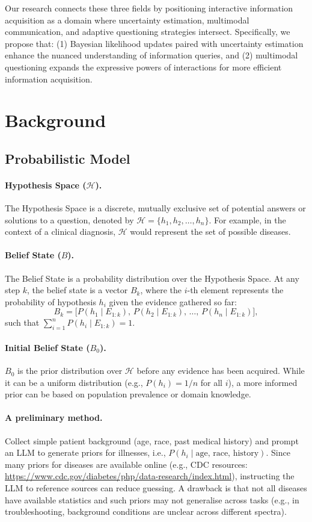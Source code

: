 \documentclass{article} %
\begin{document}
Our research connects these three fields by positioning interactive information acquisition as a domain where uncertainty estimation, multimodal communication, and adaptive questioning strategies intersect. Specifically, we propose that: (1) Bayesian likelihood updates paired with uncertainty estimation enhance the nuanced understanding of information queries, and (2) multimodal questioning expands the expressive powers of interactions for more efficient information acquisition.

\section{Background}

\subsection{Probabilistic Model}
\paragraph{Hypothesis Space ($\mathcal{H}$).}
The Hypothesis Space is a discrete, mutually exclusive set of potential answers or solutions to a question, denoted by $\mathcal{H}=\{h_1,h_2,\ldots,h_n\}$. For example, in the context of a clinical diagnosis, $\mathcal{H}$ would represent the set of possible diseases.

\paragraph{Belief State ($B$).}
The Belief State is a probability distribution over the Hypothesis Space. At any step $k$, the belief state is a vector $B_k$, where the $i$-th element represents the probability of hypothesis $h_i$ given the evidence gathered so far:
\[
B_k=\big[P(h_1\mid E_{1:k}),\,P(h_2\mid E_{1:k}),\,\ldots,\,P(h_n\mid E_{1:k})\big],
\]
such that $\sum_{i=1}^{n} P(h_i\mid E_{1:k})=1$.

\paragraph{Initial Belief State ($B_0$).}
$B_0$ is the prior distribution over $\mathcal{H}$ before any evidence has been acquired. While it can be a uniform distribution (e.g., $P(h_i)=1/n$ for all $i$), a more informed prior can be based on population prevalence or domain knowledge.

\paragraph*{A preliminary method.}
Collect simple patient background (age, race, past medical history) and prompt an LLM to generate priors for illnesses, i.e., $P(h_i \mid \text{age, race, history})$. Since many priors for diseases are available online (e.g., CDC resources: \url{https://www.cdc.gov/diabetes/php/data-research/index.html}), instructing the LLM to reference sources can reduce guessing. A drawback is that not all diseases have available statistics and such priors may not generalise across tasks (e.g., in troubleshooting, background conditions are unclear across different spectra).
\end{document}
